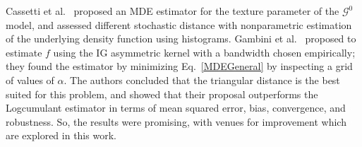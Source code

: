 \documentclass[twocolumn]{svjour3}
\begin{document}
Cassetti et al.~\cite{APSAR2013ParameterEstimationStochasticDistances} proposed an MDE estimator for the texture parameter of the $\mathcal{G}^0$ model, and assessed different stochastic distance with nonparametric estimation of the underlying density function using histograms. 
Gambini et al.~\cite{gambini2015} proposed to estimate $f$ using the IG asymmetric kernel with a bandwidth chosen empirically; 
they found the estimator by minimizing Eq.~\eqref{MDEGeneral} by inspecting a grid of values of $\alpha$. 
The authors concluded that the triangular distance is the best suited for this problem, and showed that their proposal outperforms the Logcumulant estimator in terms of mean squared error, bias, convergence, and robustness. 
So, the results were promising, with venues for improvement which are explored in this work.

%
%
%
%
%
\end{document}
